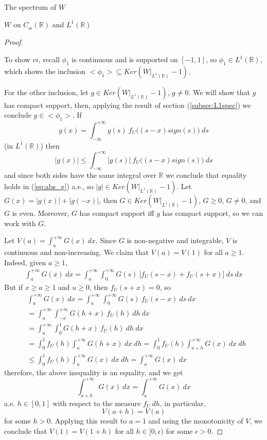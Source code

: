 \documentclass[12pt]{article}
\begin{document}
\begin{section}{The spectrum of $W$ }
\begin{subsection}{$W$ on $C_{_{0\!0}}(\mathbb{R})$ and $L^1(\mathbb{R})$}
\begin{proof}
\  
\  

To show $vi$, recall $\phi_1$ is continuous and is supported on $[-1,1]$, so $\phi_1 \in L^1(\mathbb{R})$, which shows the inclusion $ <\phi_1> \subseteq Ker\left( W\Big|_{L^1(\mathbb{R})} - 1 \right) $.

For the other inclusion, let $g \in Ker\left( W\Big|_{L^1(\mathbb{R})} - 1 \right) $, $g \ne 0$. We will show that $g$ has compact support, then, applying the result of section (\ref{subsec:L1spec}) we conclude $g \in <\phi_1>$. If
\begin{equation} \label{eq:1eigen_g}
g(x) = \int_{-\infty}^{+\infty} g(s) \ f_U\!\Big( (s-x)sign(s) \Big) \ ds
\end{equation}
(in $L^1(\mathbb{R})$) then
\begin{equation} \label{eq:abs_g}
|g(x)| \le \int_{-\infty}^{+\infty} |g(s)| \ f_U\!\Big( (s-x)sign(s) \Big) \ ds
\end{equation}
and since both sides have the same integral over $\mathbb{R}$ we conclude that equality holds in (\ref{eq:abs_g}) a.e., so $|g| \in Ker\left( W\Big|_{L^1(\mathbb{R})} - 1 \right) $. Let $G(x) = |g(x)| + |g(-x)|$, then $G \in Ker\left( W\Big|_{L^1(\mathbb{R})} - 1 \right) $, $G \ge 0$, $G \ne 0$, and $G$ is even. Moreover, $G$ has compact support iff $g$ has compact support, so we can work with $G$. 

Let $V(a) = \int_{a}^{+\infty} G(x) \ dx$. Since $G$ is non-negative and integrable, $V$ is continuous and non-increasing. We claim that $V(a) = V(1)$ for all $a \ge 1$. Indeed, given $a \ge 1$,
\begin{align*}
\int_{a}^{+\infty} G(x) \ dx = 
\int_{a}^{+\infty} \int_{0}^{+\infty} G(s) \ \Big[ f_U(s-x) + f_U(s+x) \Big] \ ds \ dx
\end{align*}
But if $x \ge a \ge 1$ and $u \ge 0$, then $f_U(s+x) = 0$, so
\begin{align*}
&\int_{a}^{+\infty} G(x) \ dx = 
\int_{a}^{+\infty} \int_{0}^{+\infty} G(s) \  f_U(s-x)  \ ds \ dx \\
&=\int_{a}^{+\infty} \int_{-x}^{+\infty}  G(h+x) \ f_U(h)  \ dh \ dx \\
&=\int_{a}^{+\infty} \int_{0}^{1}  G(h+x) \ f_U(h)  \ dh \ dx \\
&=\int_{0}^{1} f_U(h) \int_{a}^{+\infty}  G(h+x) \ dx \ dh =
\int_{0}^{1} f_U(h) \int_{a+h}^{+\infty}  G(x) \ dx \ dh \\
& \le \int_{0}^{1} f_U(h) \int_{a}^{+\infty}  G(x) \ dx \ dh = \int_{a}^{+\infty}  G(x) \ dx
\end{align*}
therefore, the above inequality is an equality, and we get
$$
\int_{a+h}^{+\infty}  G(x) \ dx =  \int_{a}^{+\infty}  G(x) \ dx 
$$
a.e. $h \in [0,1]$ with respect to the measure $f_U \ dh$, in particular,
$$
V(a+h) = V(a) 
$$
for some $h > 0$. Applying this result to $a=1$ and using the monotonicity of $V$, we conclude that $V(1)=V(1+h)$ for all $h \in [0,\epsilon)$ for some $\epsilon > 0$.  


\end{proof}
\end{subsection}
\end{section}
\end{document}
